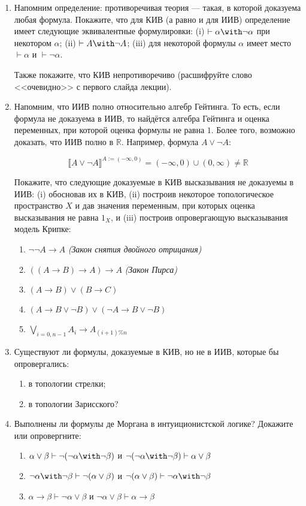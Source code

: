 \documentclass[10pt,a4paper,oneside]{article}
\begin{document}
\begin{enumerate}
\item Напомним определение: противоречивая теория --- такая, в которой доказуема любая формула. 
Покажите, что для КИВ (а равно и для ИИВ) определение имеет следующие эквивалентные формулировки:
(i) $\vdash\alpha\with\neg\alpha$ при некотором $\alpha$;
(ii) $\vdash A\with\neg A$; (iii) для некоторой формулы $\alpha$ имеет место $\vdash\alpha$ и $\vdash\neg\alpha$. 

Также покажите, что КИВ непротиворечиво (расшифруйте слово <<очевидно>> с первого слайда лекции).

\item Напомним, что ИИВ полно относительно алгебр Гейтинга. То есть, если формула не доказуема в ИИВ, то найдётся
алгебра Гейтинга и оценка переменных, при которой оценка формулы не равна $1$. Более того, возможно доказать, что ИИВ 
полно в $\mathbb{R}$. Например, формула $A\vee\neg A$:

$$\llbracket A \vee \neg A \rrbracket^{A := (-\infty,0)} = (-\infty,0) \cup (0,\infty) \ne \mathbb{R}$$

Покажите, что следующие доказуемые в КИВ высказывания не доказуемы в ИИВ: 
(i) обосновав их в КИВ, (ii) построив некоторое топологическое пространство $X$
и дав значения переменным, при которых оценка высказывания не равна $1_X$, и (iii) построив опровергающую высказывания модель Крипке:
\begin{enumerate}
\item $\neg\neg A \rightarrow A$ \emph{(Закон снятия двойного отрицания)}
\item $((A \rightarrow B) \rightarrow A) \rightarrow A$ \emph{(Закон Пирса)}
\item $(A \rightarrow B) \vee (B \rightarrow C)$
\item $(A \rightarrow B \vee \neg B) \vee (\neg A \rightarrow B \vee \neg B)$
\item $\bigvee_{i=0,n-1} A_i \rightarrow A_{(i+1) \% n}$
\end{enumerate}

\item Существуют ли формулы, доказуемые в КИВ, но не в ИИВ, которые бы опровергались:
\begin{enumerate}
\item в топологии стрелки;
\item в топологии Зарисского?
\end{enumerate}

\item Выполнены ли формулы де Моргана в интуиционистской логике? Докажите или опровергните:
\begin{enumerate}
\item $\alpha\vee\beta \vdash \neg(\neg\alpha\with\neg\beta)$ и $\neg(\neg\alpha\with\neg\beta) \vdash \alpha\vee\beta$
\item $\neg\alpha\with\neg\beta \vdash \neg(\alpha\vee\beta)$ и $\neg(\alpha\vee\beta) \vdash \neg\alpha\with\neg\beta$
\item $\alpha\rightarrow\beta \vdash \neg\alpha\vee\beta$ и $\neg\alpha\vee\beta \vdash \alpha\rightarrow\beta$
\end{enumerate}


\end{enumerate}
\end{document}
